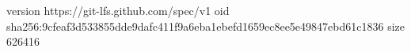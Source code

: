 version https://git-lfs.github.com/spec/v1
oid sha256:9cfeaf3d533855dde9dafc411f9a6eba1ebefd1659ec8ee5e49847ebd61c1836
size 626416
